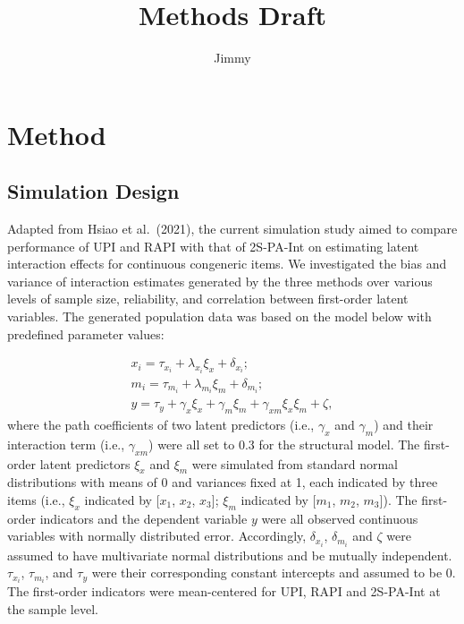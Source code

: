 \documentclass[
  man]{apa7}
\title{Methods Draft}
\author{Jimmy\textsuperscript{}}
\date{}
\affiliation{\phantom{0}}
\begin{document}
\maketitle

\hypertarget{method}{%
\section{Method}\label{method}}

\hypertarget{simulation-design}{%
\subsection{Simulation Design}\label{simulation-design}}

Adapted from Hsiao et al.~(2021), the current simulation study aimed to compare performance of UPI and RAPI with that of 2S-PA-Int on estimating latent interaction effects for continuous congeneric items. We investigated the bias and variance of interaction estimates generated by the three methods over various levels of sample size, reliability, and correlation between first-order latent variables. The generated population data was based on the model below with predefined parameter values:

\begin{equation}
\begin{gathered}
x_{i} =  \tau_{x_{i}} + \lambda_{x_{i}}\xi_{x} + \delta_{x_{i}};\\
m_{i} =  \tau_{m_{i}} + \lambda_{m_{i}}\xi_{m} + \delta_{m_{i}};\\
y =  \tau_{y} + \gamma_{x}\xi_{x} + \gamma_{m}\xi_{m} + \gamma_{xm}\xi_{x}\xi_{m} + \zeta,
\end{gathered}
\end{equation}
where the path coefficients of two latent predictors (i.e., \(\gamma_{x}\) and \(\gamma_{m}\)) and their interaction term (i.e., \(\gamma_{xm}\)) were all set to 0.3 for the structural model. The first-order latent predictors \(\xi_{x}\) and \(\xi_{m}\) were simulated from standard normal distributions with means of 0 and variances fixed at 1, each indicated by three items (i.e., \(\xi_{x}\) indicated by {[}\(x_{1}\), \(x_{2}\), \(x_{3}\){]}; \(\xi_{m}\) indicated by {[}\(m_{1}\), \(m_{2}\), \(m_{3}\){]}). The first-order indicators and the dependent variable \(y\) were all observed continuous variables with normally distributed error. Accordingly, \(\delta_{x_{i}}\), \(\delta_{m_{i}}\) and \(\zeta\) were assumed to have multivariate normal distributions and be mutually independent. \(\tau_{x_{i}}\), \(\tau_{m_{i}}\), and \(\tau_{y}\) were their corresponding constant intercepts and assumed to be 0. The first-order indicators were mean-centered for UPI, RAPI and 2S-PA-Int at the sample level.
\end{document}
